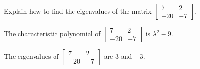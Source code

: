 
\begin{exerciseStatement}


Explain how to find the eigenvalues of the matrix \( \left[\begin{array}{cc}
7 & 2 \\
-20 & -7
\end{array}\right] \).


\end{exerciseStatement}
    
\begin{exerciseAnswer} 


The characteristic polynomial of \( \left[\begin{array}{cc}
7 & 2 \\
-20 & -7
\end{array}\right] \) is \( \lambda^{2} - 9 \).



The eigenvalues of \( \left[\begin{array}{cc}
7 & 2 \\
-20 & -7
\end{array}\right] \) are \( 3 \) and \( -3 \).


\end{exerciseAnswer}
    

